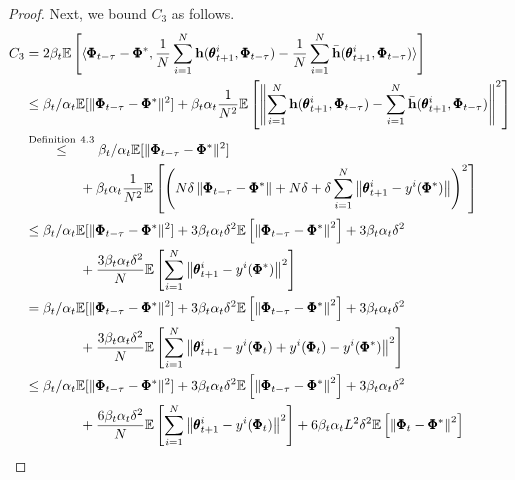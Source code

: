 \documentclass[10pt,a4paper]{amsart}
\def\bh{\mathbf{h}}
\begin{document}
\begin{proof}
Next, we bound $C_3$ as follows.
\begin{align*}
    C_3&=2\beta_t\mathbb{E}\left[\langle\pmb{\Phi}_{t-\tau}-\pmb{\Phi}^*, \frac{1}{N}\sum_{i=1}^N\bh(\pmb{\theta}_{t+1}^i, \pmb{\Phi}_{t-\tau})- \frac{1}{N}\sum_{i=1}^N\bar{\bh}(\pmb{\theta}_{t+1}^i, \pmb{\Phi}_{t-\tau})\rangle\right]\allowdisplaybreaks\\
    &\leq\beta_t/\alpha_t\mathbb{E}[\|\pmb{\Phi}_{t-\tau}-\pmb{\Phi}^*\|^2]+\beta_t\alpha_t\frac{1}{N^2}\mathbb{E}\left[\left\|\sum_{i=1}^N\bh(\pmb{\theta}_{t+1}^i, \pmb{\Phi}_{t-\tau})- \sum_{i=1}^N\bar{\bh}(\pmb{\theta}_{t+1}^i, \pmb{\Phi}_{t-\tau})\right\|^2\right]\allowdisplaybreaks\\
    &\overset{\text{Definition}~4.3}{\leq}\beta_t/\alpha_t\mathbb{E}[\|\pmb{\Phi}_{t-\tau}-\pmb{\Phi}^*\|^2]\allowdisplaybreaks\\
    &\qquad\qquad+\beta_t\alpha_t\frac{1}{N^2}\mathbb{E}\left[\left(N\delta\left\|\pmb{\Phi}_{t-\tau}-\pmb{\Phi}^*\right\|+N\delta+\delta\sum_{i=1}^N\left\|\pmb{\theta}_{t+1}^i-y^i(\pmb{\Phi}^*)\right\|\right)^2\right]\allowdisplaybreaks\\
    &\leq\beta_t/\alpha_t\mathbb{E}[\|\pmb{\Phi}_{t-\tau}-\pmb{\Phi}^*\|^2]+3\beta_t\alpha_t\delta^2\mathbb{E}\left[\left\|\pmb{\Phi}_{t-\tau}-\pmb{\Phi}^*\right\|^2\right]+3\beta_t\alpha_t\delta^2\allowdisplaybreaks\\
    &\qquad\qquad+\frac{3\beta_t\alpha_t\delta^2}{N}\mathbb{E}\left[\sum_{i=1}^N\left\|\pmb{\theta}_{t+1}^i-y^i(\pmb{\Phi}^*)\right\|^2\right]\allowdisplaybreaks\\
    &=\beta_t/\alpha_t\mathbb{E}[\|\pmb{\Phi}_{t-\tau}-\pmb{\Phi}^*\|^2]+3\beta_t\alpha_t\delta^2\mathbb{E}\left[\left\|\pmb{\Phi}_{t-\tau}-\pmb{\Phi}^*\right\|^2\right]+3\beta_t\alpha_t\delta^2\nonumber\allowdisplaybreaks\\
    &\qquad\qquad+\frac{3\beta_t\alpha_t\delta^2}{N}\mathbb{E}\left[\sum_{i=1}^N\left\|\pmb{\theta}_{t+1}^i-y^i(\pmb{\Phi}_t)+y^i(\pmb{\Phi}_t)-y^i(\pmb{\Phi}^*)\right\|^2\right]\allowdisplaybreaks\\
    &\leq\beta_t/\alpha_t\mathbb{E}[\|\pmb{\Phi}_{t-\tau}-\pmb{\Phi}^*\|^2]+3\beta_t\alpha_t\delta^2\mathbb{E}\left[\left\|\pmb{\Phi}_{t-\tau}-\pmb{\Phi}^*\right\|^2\right]+3\beta_t\alpha_t\delta^2\allowdisplaybreaks\\
    &\qquad\qquad+\frac{6\beta_t\alpha_t\delta^2}{N}\mathbb{E}\left[\sum_{i=1}^N\left\|\pmb{\theta}_{t+1}^i-y^i(\pmb{\Phi}_t)\right\|^2\right]+{6\beta_t\alpha_tL^2\delta^2}\mathbb{E}\left[\left\|\pmb{\Phi}_t-\pmb{\Phi}^*\right\|^2\right]\allowdisplaybreaks\\

\end{align*}
\end{proof}
\end{document}

